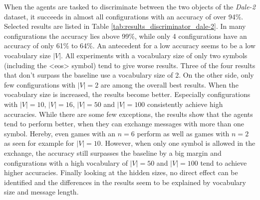 When the agents are tasked to discriminate between the two objects of the \emph{Dale-2} dataset, it succeeds in almost all configurations with an accuracy of over 94\%.
Selected results are listed in Table \ref{tab:results_discriminator_dale-2}.
In many configurations the accuracy lies above 99\%, while only 4 configurations have an accuracy of only 61\% to 64\%.
An antecedent for a low accuracy seems to be a low vocabulary size $|V|$.
All experiments with a vocabulary size of only two symbols (including the <eos> symbol) tend to give worse results.
Three of the four results that don't surpass the baseline use a vocabulary size of 2.
On the other side, only few configurations with $|V| = 2$ are among the overall best results.
When the vocabulary size is increased, the results become better.
Especially configurations with $|V| = 10$, $|V| = 16$, $|V| = 50$ and $|V| = 100$ consistently achieve high accuracies.
While there are some few exceptions, the results show that the agents tend to perform better, when they can exchange messages with more than one symbol.
Hereby, even games with an $n = 6$ perform as well as games with $n = 2$ as seen for example for $|V| = 10$.
However, when only one symbol is allowed in the exchange, the accuracy still surpasses the baseline by a big margin and configurations with a high vocabulary of $|V| = 50$ and $|V| = 100$ tend to achieve higher accuracies.
Finally looking at the hidden sizes, no direct effect can be identified and the differences in the results seem to be explained by vocabulary size and message length.

